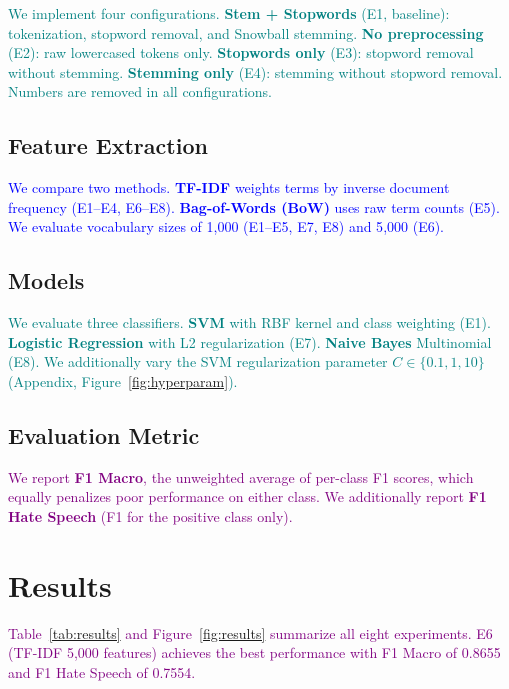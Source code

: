 \documentclass[11pt,a4paper,twocolumn]{article}
\newcommand{\authorone}[1]{\textcolor{blue}{#1}}      %
\newcommand{\authortwo}[1]{\textcolor{teal}{#1}}      %
\newcommand{\joint}[1]{\textcolor{purple}{#1}}        %
\begin{document}
\authortwo{
We implement four configurations.
\textbf{Stem + Stopwords} (E1, baseline): tokenization, stopword removal,
and Snowball stemming.
\textbf{No preprocessing} (E2): raw lowercased tokens only.
\textbf{Stopwords only} (E3): stopword removal without stemming.
\textbf{Stemming only} (E4): stemming without stopword removal.
Numbers are removed in all configurations.
}

\subsection{Feature Extraction}

\authorone{
We compare two methods.
\textbf{TF-IDF} \citep{manning2008} weights terms by inverse document
frequency (E1--E4, E6--E8).
\textbf{Bag-of-Words (BoW)} uses raw term counts (E5).
We evaluate vocabulary sizes of 1{,}000 (E1--E5, E7, E8) and 5{,}000 (E6).
}

\subsection{Models}

\authortwo{
We evaluate three classifiers.
\textbf{SVM} \citep{joachims1998} with RBF kernel and class weighting (E1).
\textbf{Logistic Regression} with L2 regularization (E7).
\textbf{Naive Bayes} Multinomial (E8).
We additionally vary the SVM regularization parameter
$C \in \{0.1, 1, 10\}$ (Appendix, Figure~\ref{fig:hyperparam}).
}

\subsection{Evaluation Metric}

\joint{
We report \textbf{F1 Macro}, the unweighted average of per-class F1 scores,
which equally penalizes poor performance on either class.
We additionally report \textbf{F1 Hate Speech} (F1 for the positive class only).
}

\section{Results}

\joint{
Table~\ref{tab:results} and Figure~\ref{fig:results} summarize all eight
experiments. E6 (TF-IDF 5{,}000 features) achieves the best performance
with F1 Macro of 0.8655 and F1 Hate Speech of 0.7554.
}
\end{document}
